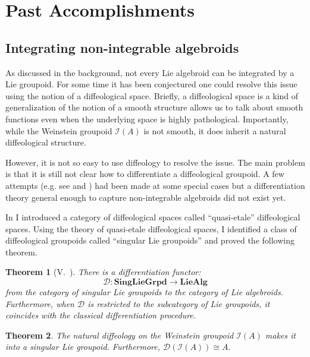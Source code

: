 \documentclass[11pt, letterpaper]{article}
\newtheorem{theorem}{Theorem}
\begin{document}
\section{Past Accomplishments}

\subsection{Integrating non-integrable algebroids}

As discussed in the background, not every Lie algebroid can be integrated by a Lie groupoid. For some time it has been conjectured one could resolve this issue using the notion of a diffeological space. Briefly, a diffeological space is a kind of generalization of the notion of a smooth structure allows us to talk about smooth functions even when the underlying space is highly pathological. Importantly, while the Weinstein groupoid \( \mathcal{I}(A) \) is not smooth, it does inherit a natural diffeological structure.

However, it is not so easy to use diffeology to resolve the issue. The main problem is that it is still not clear how to differentiate a diffeological groupoid. A few attempts (e.g. see \cite{androulidakis2020integration} and \cite{blohmann2023elastic}) had been made at some special cases but a differentiation theory general enough to capture non-integrable algebroids did not exist yet. 

In \cite{nonintegrable} I introduced a category of diffeological spaces called ``quasi-etale'' diffeological spaces.
Using the theory of quasi-etale diffeological spaces, I identified a class of diffeological groupoids called ``singular Lie groupoids'' and proved the following theorem.

\begin{theorem}[V.~\cite{nonintegrable}]
    There is a differentiation functor:
    \[ \mathcal{D} \colon  \textbf{SingLieGrpd} \to \textbf{LieAlg} \]
    from the category of singular Lie groupoids to the category of Lie algebroids. Furthermore, when \( \mathcal{D} \) is restricted to the subcategory of Lie groupoids, it coincides with the classical differentiation procedure.
\end{theorem}

\begin{theorem}
    The natural diffeology on the Weinstein groupoid \( \mathcal{I}(A) \) makes it into a singular Lie groupoid. Furthermore, \( \mathcal{D}(\mathcal{I}(A)) \cong A  \).
\end{theorem}
\end{document}
